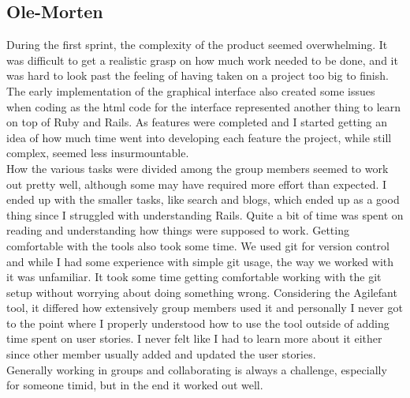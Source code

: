\documentclass[a4paper]{article}
\begin{document}
\subsection{Ole-Morten}
\noindent
During the first sprint, the complexity of the product seemed overwhelming. It was difficult to get a realistic grasp on how much work needed to be done, and it was hard to look past the feeling of having taken on a project too big to finish. The early implementation of the graphical interface also created some issues when coding as the html code for the interface represented another thing to learn on top of Ruby and Rails. As features were completed and I started getting an idea of how much time went into developing each feature the project, while still complex, seemed less insurmountable.\\

\noindent
How the various tasks were divided among the group members seemed to work out pretty well, although some may have required more effort than expected. I ended up with the smaller tasks, like search and blogs, which ended up as a good thing since I struggled with understanding Rails. Quite a bit of time was spent on reading and understanding how things were supposed to work. Getting comfortable with the tools also took some time. We used git for version control and while I had some experience with simple git usage, the way we worked with it was unfamiliar. It took some time getting comfortable working with the git setup without worrying about doing something wrong. Considering the Agilefant tool, it differed how extensively group members used it and personally I never got to the point where I properly understood how to use the tool outside of adding time spent on user stories. I never felt like I had to learn more about it either since other member usually added and updated the user stories.\\

\noindent
Generally working in groups and collaborating is always a challenge, especially for someone timid, but in the end it worked out well.


\end{document}

